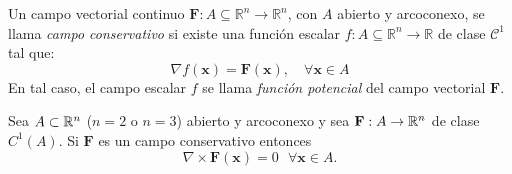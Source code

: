 \begin{definition}\label{conser} 
Un campo vectorial continuo $\mathbf{F}: A \subseteq \mathbb{R}^n \to \mathbb{R}^n$, con $A$ abierto y arcoconexo, se llama \emph{campo conservativo} si existe una función escalar $f: A \subseteq \mathbb{R}^n \to \mathbb{R}$ de clase $\mathcal{C}^1$ tal que:
\[ \nabla f(\mathbf{x}) = \mathbf{F}(\mathbf{x}), \quad \forall \mathbf{x} \in A \] 
En tal caso, el campo escalar $f$ se llama \emph{función potencial} del campo vectorial $\mathbf{F}$. 
\end{definition}

\begin{propertie}\label{conserv}  Sea $A\subset \mathbb{R}^n$   ($n=2$ o $n=3$)  abierto y arcoconexo y sea  $\mathbf{F}:A  \to \mathbb{R}^n$  de clase $C^{1}(A).$  Si $\mathbf{F}$ es  un campo conservativo entonces $$\nabla \times \mathbf{F}(\mathbf{x}) =0 \:\:\: \forall \mathbf{x} \in A.  $$  
\end{propertie}

